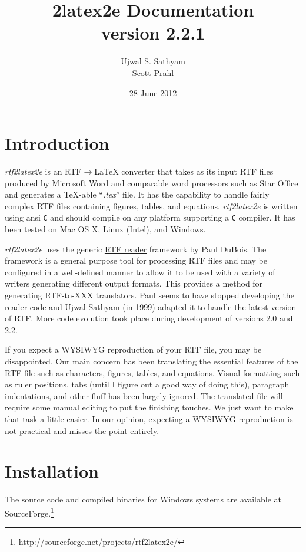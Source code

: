 \documentclass{article}
\title{\rtf2latex2e Documentation\\
version 2.2.1}
\author{Ujwal S. Sathyam\\ Scott Prahl}
\date{28 June 2012}
\def\rtf2latex2e{{\it rtf2latex2e}}
\begin{document}
 
\maketitle

\section{Introduction 
\label{intro}} \rtf2latex2e is an RTF$\rightarrow${\LaTeX}
converter that takes as its input RTF files produced by Microsoft Word
and comparable word processors such as Star Office and generates a
\TeX-able ``{\it .tex}'' file.  It has the capability to handle fairly
complex RTF files containing figures, tables, and equations.  
\rtf2latex2e is written using ansi \texttt{C} and
should compile on any platform supporting a \texttt{C} compiler.  It has
been tested on Mac OS X, Linux (Intel), and Windows.

\rtf2latex2e uses the generic
\href{http://www.snake.net/software/RTF/}{RTF reader}
framework by Paul DuBois.  The framework is a general purpose tool for
processing RTF files and may be configured in a well-defined manner to
allow it to be used with a variety of writers generating different
output formats.  This provides a method for generating RTF-to-XXX
translators.  Paul seems to have stopped developing the
reader code and Ujwal Sathyam (in 1999) adapted it to handle the
latest version of RTF.  More code evolution took place during
development of versions 2.0 and 2.2.

If you expect a WYSIWYG reproduction of your RTF file, you may be
disappointed.  Our main concern has been translating the essential
features of the RTF file such as characters, figures, tables, and
equations.  Visual formatting
such as ruler positions, tabs (until I figure out a good way of doing
this), paragraph indentations, and other fluff has been largely ignored.  
The translated {\LaTeXe} file will require some manual editing to put the
finishing touches.  We just want to make that task a little easier.  In
our opinion, expecting a WYSIWYG reproduction is not practical and
misses the point entirely.

\section{Installation}
The source code and compiled binaries for Windows systems are available at SourceForge.\footnote{\url{http://sourceforge.net/projects/rtf2latex2e/}}
\end{document}

